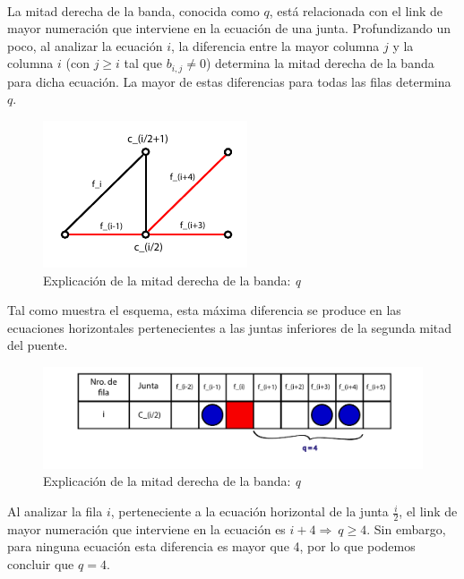 ~

La mitad derecha de la banda, conocida como $q$, está relacionada con el link de mayor numeración que interviene en la ecuación
de una junta. Profundizando un poco, al analizar la ecuación $i$, la 
diferencia entre la mayor columna $j$ y la columna $i$ (con $j \geq i$ tal que $b_{i,j} \neq 0$)
determina la mitad derecha de la banda para dicha ecuación. La mayor de estas diferencias para todas las filas determina $q$.

\begin{figure}[!h]
	\begin{center}
		  \includegraphics[scale=1.5]{Imagenes/im_6.pdf}
		  \caption{Explicación de la mitad derecha de la banda: \emph{q}}
		  \label{fig:contra1}
	\end{center}
\end{figure}
\FloatBarrier

Tal como muestra el esquema, esta máxima diferencia se produce en las ecuaciones horizontales pertenecientes a las juntas
inferiores de la segunda mitad del puente. 

\begin{figure}[!h]
	\begin{center}
		  \includegraphics[scale=0.5]{Imagenes/im_7.pdf}
		  \caption{Explicación de la mitad derecha de la banda: \emph{q}}
		  \label{fig:contra1}
	\end{center}
\end{figure}
\FloatBarrier

Al analizar la fila $i$, perteneciente a la ecuación horizontal de la junta $\frac{i}{2}$, el link de mayor numeración que
interviene en la ecuación es $i+4 \Rightarrow \ q \geq 4$. Sin embargo, para ninguna ecuación esta diferencia es mayor que 
4, por lo que podemos concluir que $q=4$.

